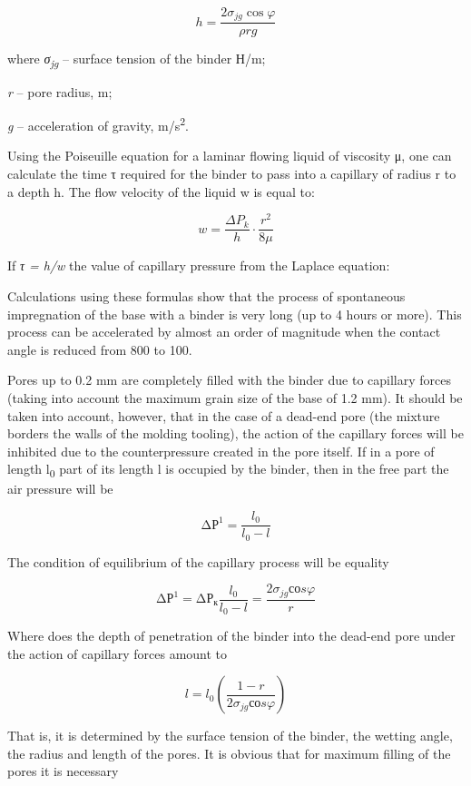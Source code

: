 \begin{multicols}{2}
\begin{equation*}
    h = \frac{2\sigma_{jg} \cos\varphi}{\rho r g}
\end{equation*}

where \emph{σ\textsubscript{jg}} -- surface tension of the binder Н/m;

\emph{r} -- pore radius, m;

\emph{g} -- acceleration of gravity, m/s\textsuperscript{2}.

Using the Poiseuille equation for a laminar flowing liquid of viscosity
μ, one can calculate the time τ required for the binder to pass into a
capillary of radius r to a depth h. The flow velocity of the liquid w is
equal to:

\begin{equation*}
    w = \frac{\Delta P_{k}}{h} \cdot \frac{r^2}{8\mu}
\end{equation*}

If \emph{τ = h/w} the value of capillary pressure from the Laplace
equation:


Calculations using these formulas show that the process of spontaneous
impregnation of the base with a binder is very long (up to 4 hours or
more). This process can be accelerated by almost an order of magnitude
when the contact angle is reduced from 800 to 100.

Pores up to 0.2 mm are completely filled with the binder due to
capillary forces (taking into account the maximum grain size of the base
of 1.2 mm). It should be taken into account, however, that in the case
of a dead-end pore (the mixture borders the walls of the molding
tooling), the action of the capillary forces will be inhibited due to
the counterpressure created in the pore itself. If in a pore of length
l\textsubscript{0} part of its length l is occupied by the binder, then
in the free part the air pressure will be

\[\mathrm{\Delta}Р^{1} = \frac{l_{0}}{l_{0} - l}\]

The condition of equilibrium of the capillary process will be equality

\[\mathrm{\Delta}Р^{1} = \mathrm{\Delta}{Р_{к}}\frac{l_{0}}{l_{0} - l} = \frac{2\sigma_{jg}соs\varphi}{r}\]

Where does the depth of penetration of the binder into the dead-end pore
under the action of capillary forces amount to

\[l = l_{0}\left( \frac{1 - r}{2\sigma_{jg}соs\varphi} \right)\]

That is, it is determined by the surface tension of the binder, the
wetting angle, the radius and length of the pores. It is obvious that
for maximum filling of the pores it is necessary


\end{multicols}
